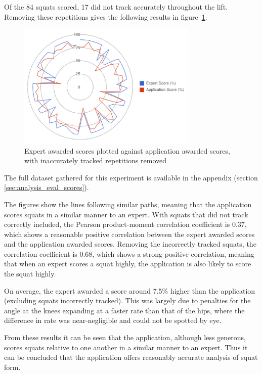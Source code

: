 Of the 84 squats scored, 17 did not track accurately throughout the lift. Removing these repetitions gives the following results in figure~\ref{fig:scorediffgood}.

\begin{figure}[H]
    \centering
	\includegraphics[height=6cm]{evaluation/images/scores_difference_goodtrack}
\caption{Expert awarded scores plotted against application awarded scores, with inaccurately tracked repetitions removed}
\label{fig:scorediffgood}
\end{figure}

The full dataset gathered for this experiment is available in the appendix (section \ref{sec:analysis_eval_scores}).

The figures show the lines following similar paths, meaning that the application scores squats in a similar manner to an expert. With squats that did not track correctly included, the Pearson product-moment correlation coefficient is 0.37, which shows a reasonable positive correlation between the expert awarded scores and the application awarded scores. Removing the incorrectly tracked squats, the correlation coefficient is 0.68, which shows a strong positive correlation, meaning that when an expert scores a squat highly, the application is also likely to score the squat highly.

On average, the expert awarded a score around 7.5\% higher than the application (excluding squats incorrectly tracked). This was largely due to penalties for the angle at the knees expanding at a faster rate than that of the hips, where the difference in rate was near-negligible and could not be spotted by eye.

From these results it can be seen that the application, although less generous, scores squats relative to one another in a similar manner to an expert. Thus it can be concluded that the application offers reasonably accurate analysis of squat form.

